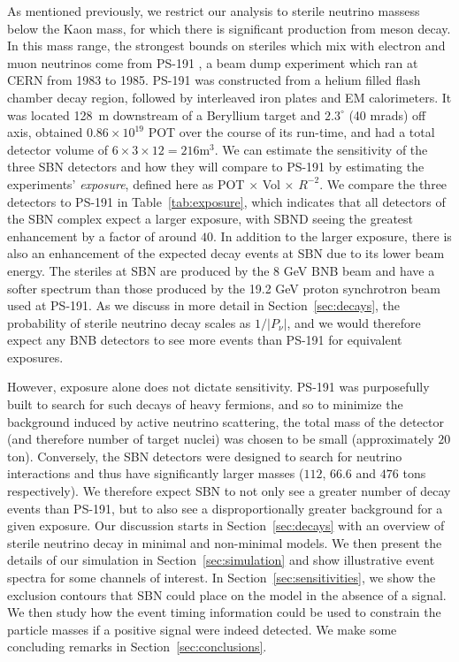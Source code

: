 \documentclass[11pt, a4paper]{article}
\newcommand{\refsec}[1]{Section~\ref{#1}}
\newcommand{\reftab}[1]{Table~\ref{#1}}
\begin{document}
As mentioned previously, we restrict our analysis to sterile neutrino massess
below the Kaon mass, for which there is significant production from meson
decay. In this mass range, the strongest bounds on steriles which mix with
electron and muon neutrinos come from PS-191 \cite{Bernardi:1985ny,
Bernardi:1987ek}, a beam dump experiment which ran at CERN from 1983 to 1985. 
%
PS-191 was constructed from a helium filled flash chamber decay region,
followed by interleaved iron plates and EM calorimeters. It was located 128~m
downstream of a Beryllium target and $2.3^\circ$ (40 mrads) off axis, obtained
$0.86 \times 10^{19}$ POT over the course of its run-time, and had a total
detector volume of $6\times3\times12 = 216 \text{m}^3$. We can estimate the
sensitivity of the three SBN detectors and how they will compare to PS-191 by
estimating the experiments' \emph{exposure}, defined here as POT $\times$ Vol
$\times$ $R^{-2}$. We compare the three detectors to PS-191 in
\reftab{tab:exposure}, which indicates that all detectors of the SBN complex
expect a larger exposure, with SBND seeing the greatest enhancement by a factor
of around $40$. 
%
In addition to the larger exposure, there is also an enhancement of the
expected decay events at SBN due to its lower beam energy. The steriles at SBN
are produced by the 8 GeV BNB beam and have a softer spectrum than those
produced by the 19.2 GeV proton synchrotron beam used at PS-191. As we discuss
in more detail in \refsec{sec:decays}, the probability of sterile neutrino
decay scales as $1/|P_\nu|$, and we would therefore expect any BNB detectors to
see more events than PS-191 for equivalent exposures.

However, exposure alone does not dictate sensitivity. PS-191 was purposefully
built to search for such decays of heavy fermions, and so to minimize
the background induced by active neutrino scattering, the total mass of the
detector (and therefore number of target nuclei) was chosen to be small
(approximately $20$ ton). Conversely, the SBN detectors were designed to search
for neutrino interactions and thus have significantly larger masses ($112$,
$66.6$ and $476$ tons respectively). We therefore expect SBN to not only see a
greater number of decay events than PS-191, but to also see a disproportionally
greater background for a given exposure.
%
Our discussion starts in \refsec{sec:decays} with an overview of sterile
neutrino decay in minimal and non-minimal models. We then present the details
of our simulation in \refsec{sec:simulation} and show illustrative event
spectra for some channels of interest. In \refsec{sec:sensitivities}, we show
the exclusion contours that SBN could place on the model in the absence of a
signal. We then study how the event timing information could be used to
constrain the particle masses if a positive signal were indeed detected. We
make some concluding remarks in \refsec{sec:conclusions}.
\end{document}
